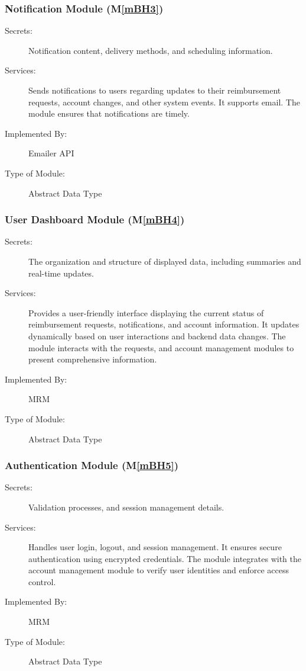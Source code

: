 \documentclass[12pt, titlepage]{article}
\newcommand{\mref}[1]{M\ref{#1}}
\begin{document}
\subsubsection{Notification Module (\mref{mBH3})}

\begin{description}
\item[Secrets:] Notification content, delivery methods, and scheduling information.
\item[Services:] Sends notifications to users regarding updates to their reimbursement requests, account changes, and other system events. It supports email. The module ensures that notifications are timely.
\item[Implemented By:] Emailer API
\item[Type of Module:] Abstract Data Type
\end{description}

\subsubsection{User Dashboard Module (\mref{mBH4})}

\begin{description}
\item[Secrets:] The organization and structure of displayed data, including summaries and real-time updates.
\item[Services:] Provides a user-friendly interface displaying the current status of reimbursement requests, notifications, and account information. It updates dynamically based on user interactions and backend data changes. The module interacts with the requests, and account management modules to present comprehensive information.
\item[Implemented By:] MRM
\item[Type of Module:] Abstract Data Type
\end{description}

\subsubsection{Authentication Module (\mref{mBH5})}

\begin{description}
\item[Secrets:] Validation processes, and session management details.
\item[Services:] Handles user login, logout, and session management. It ensures secure authentication using encrypted credentials. The module integrates with the account management module to verify user identities and enforce access control.
\item[Implemented By:] MRM
\item[Type of Module:] Abstract Data Type
\end{description}
\end{document}
